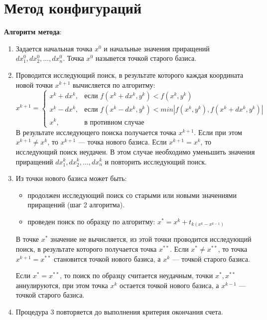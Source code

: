 \section{Метод конфигураций}

\textbf{Алгоритм метода}:
\begin{enumerate}
\item Задается начальная точка $x^{0}$ и начальные значения приращений $dx_{1}^{0}, dx_{2}^{0}, \ldots, dx_{n}^{0}$. Точка $x^{0}$ назывется точкой старого базиса.
\item Проводится исследующий поиск, в результате которого каждая координата новой точки $x^{k+1}$ вычисляется по алгоритму:
$$
x^{k+1} = 
\begin{cases}
x^{k} + dx^{k},&\text{если $f(x^{k} + dx^{k}, y^{k}) < f(x^{k}, y^{k})$}\\
x^{k} - dx^{k},&\text{если $f(x^{k} - dx^{k}, y^{k}) < min|f(x^{k}, y^{k}), f(x^{k} + dx^{k}, y^{k})|$}\\
x^{k},&\text{в противном случае}
\end{cases}
$$
В результате исследующего поиска получается точка $x^{k+1}$. Если при этом $x^{k+1} \neq x^{k}$, то $x^{k+1}$ --- точка нового базиса. Если $x^{k+1} = x^{k}$, то исследующий поиск неудачен. В этом случае необходимо уменьшить значения приращений 
$dx_{1}^{k}, dx_{2}^{k}, \ldots, dx_{n}^{k}$ и повторить исследующий поиск.

\item  Из точки нового базиса может быть:
\begin{itemize}
	\item продолжен исследующий поиск со старыми или новыми значениями приращений (шаг 2 алгоритма).
	\item проведен поиск по образцу по алгоритму: $x^{*} = x^{k} + t_{k(x^{k} - x^{k-1})}$
\end{itemize}

В точке $x^{*}$ значение не вычисляется, из этой точки проводится исследующий поиск, в результате которого получается точка $x^{**}$. Если $x^{*} \neq x^{**}$, то точка $x^{k+1} = x^{**}$ становится точкой нового базиса, а $x^{k}$ --- точкой старого базиса.

Если $x^{*} = x^{**}$, то поиск по образцу считается неудачным, точки $x^{*}, x^{**}$ аннулируются, при этом точка $x^{k}$ остается точкой нового базиса, а $x^{k - 1}$ --- точкой старого базиса.

\item Процедура 3 повторяется до выполнения критерия окончания счета.
\end{enumerate}

